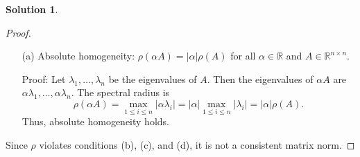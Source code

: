 \documentclass[12pt]{article}
\theoremstyle{definition}
\newtheorem*{solution}{\normalfont\textbf{Solution}}
\begin{document}
\begin{enumerate}[leftmargin=*]
\begin{solution}
\begin{proof}
                \begin{enumerate}
                    \item[(a)] Absolute homogeneity: \(\rho(\alpha A) = |\alpha| \rho(A)\) for all \(\alpha \in \mathbb{R}\) and \(A \in \mathbb{R}^{n \times n}\).
                    
                    Proof: Let \(\lambda_1, \dots, \lambda_n\) be the eigenvalues of \(A\). Then the eigenvalues of \(\alpha A\) are \(\alpha \lambda_1, \dots, \alpha \lambda_n\). The spectral radius is
                    \[
                    \rho(\alpha A) = \max_{1 \leq i \leq n} |\alpha \lambda_i| = |\alpha| \max_{1 \leq i \leq n} |\lambda_i| = |\alpha| \rho(A).
                    \]
                    Thus, absolute homogeneity holds.
                \end{enumerate}

                Since \(\rho\) violates conditions (b), (c), and (d), it is not a consistent matrix norm.
            \end{proof}
         \end{solution}
    

\end{enumerate}
\end{document}
